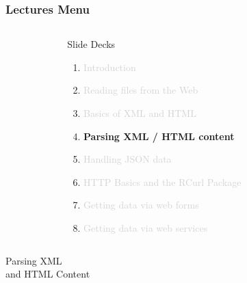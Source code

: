 \documentclass{beamer}\usepackage[]{graphicx}\usepackage[]{color}
\begin{document}
\begin{frame}
\frametitle{Lectures Menu}

\begin{columns}[t]
\begin{column}{0.1\textwidth}
\end{column}
\begin{column}{0.8\textwidth}
 \begin{block}{Slide Decks}
  \begin{enumerate}
   \item \textcolor{lightgray}{Introduction}
   \item \textcolor{lightgray}{Reading files from the Web}
   \item \textcolor{lightgray}{Basics of XML and HTML}
   \item \textbf{Parsing XML / HTML content}
   \item \textcolor{lightgray}{Handling JSON data}
   \item \textcolor{lightgray}{HTTP Basics and the RCurl Package}   
   \item \textcolor{lightgray}{Getting data via web forms}
   \item \textcolor{lightgray}{Getting data via web services}
  \end{enumerate}
 \end{block}
\end{column}
\begin{column}{0.1\textwidth}
\end{column}
\end{columns}

\end{frame}


\begin{frame}
 \begin{center}
  \Huge{\textcolor{mandarina}{Parsing XML \\ and HTML Content}}
 \end{center}
\end{frame}

\end{document}

